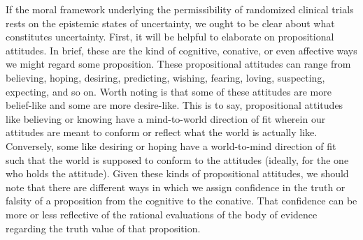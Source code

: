 \documentclass[letterpaper,notitlepage,12pt]{article}
\begin{document}
If the moral framework underlying the permissibility of randomized clinical
trials rests on the epistemic states of uncertainty, we ought to be
clear about what constitutes uncertainty.
First, it will be helpful to elaborate on propositional attitudes.
In brief, these are the kind of cognitive, conative, or even affective ways we
might regard some proposition.
These propositional attitudes can range from believing, hoping, desiring,
predicting, wishing, fearing, loving, suspecting, expecting, and so on.
Worth noting is that some of these attitudes are more belief-like and some are
more desire-like.
This is to say, propositional attitudes like believing or knowing have a
mind-to-world direction of fit wherein our attitudes are meant to conform or
reflect what the world is actually like.
Conversely, some like desiring or hoping have a world-to-mind direction of fit
such that the world is supposed to conform to the attitudes (ideally, for the
one who holds the attitude).
Given these kinds of propositional attitudes, we should note that there are
different ways in which we assign confidence in the truth or falsity of a
proposition from the cognitive to the conative.
That confidence can be more or less reflective of the rational evaluations of
the body of evidence regarding the truth value of that proposition.
\end{document}
